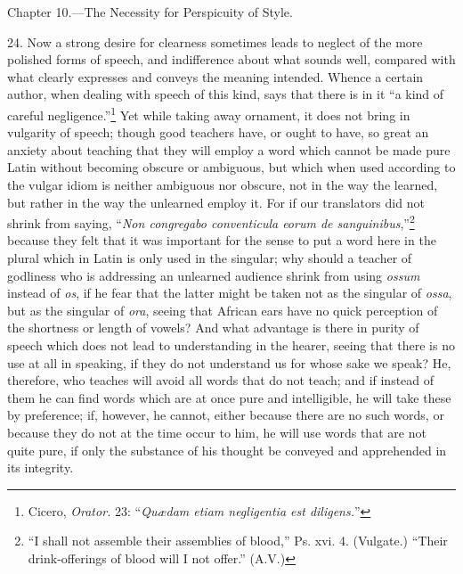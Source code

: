 
Chapter 10.—The Necessity for Perspicuity of Style.

24. Now a strong desire for clearness sometimes leads to neglect of the more polished forms of speech, and indifference about what sounds well, compared with what clearly expresses and conveys the meaning intended. Whence a certain author, when dealing with speech of this kind, says that there is in it “a kind of careful negligence.”\footnote{Cicero, \emph{Orator.} 23: “\emph{Quædam etiam negligentia est diligens.}”} Yet while taking away ornament, it does not bring in vulgarity of speech; though good teachers have, or ought to have, so great an anxiety about teaching that they will employ a word which cannot be made pure Latin without becoming obscure or ambiguous, but which when used according to the vulgar idiom is neither ambiguous nor obscure, not in the way the learned, but rather in the way the unlearned employ it. For if our translators did not shrink from saying, “\emph{Non congregabo conventicula eorum de sanguinibus},”\footnote{“I shall not assemble their assemblies of blood,” Ps. xvi. 4. (Vulgate.) “Their drink-offerings of blood will I not offer.” (A.V.)} because they felt that it was important for the sense to put a word here in the plural which in Latin is only used in the singular; why should a teacher of godliness who is addressing an unlearned audience shrink from using \emph{ossum} instead of \emph{os}, if he fear that the latter might be taken not as the singular of \emph{ossa}, but as the singular of \emph{ora}, seeing that African ears have no quick perception of the shortness or length of vowels? And what advantage is there in purity of speech which does not lead to understanding in the hearer, seeing that there is no use at all in speaking, if they do not understand us for whose sake we speak? He, therefore, who teaches will avoid all words that do not teach; and if instead of them he can find words which are at once pure and intelligible, he will take these by preference; if, however, he cannot, either because there are no such words, or because they do not at the time occur to him, he will use words that are not quite pure, if only the substance of his thought be conveyed and apprehended in its integrity.

